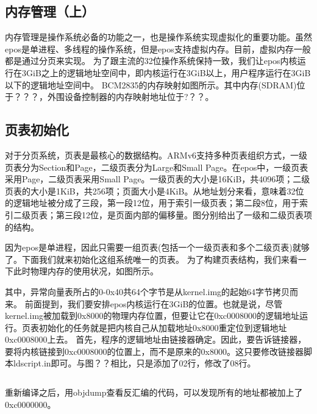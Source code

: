 \documentclass[main.tex]{subfiles}
\begin{document}
\ifxetex\else
\begin{CJK*}{UTF8}{song}
\fi

\chapter{内存管理（上）}
内存管理是操作系统必备的功能之一，也是操作系统实现虚拟化的重要功能。虽然epos是单进程、多线程的操作系统，但是epos支持虚拟内存。目前，虚拟内存一般都是通过分页来实现。
为了跟主流的32位操作系统保持一致，我们让epos内核运行在3GiB之上的逻辑地址空间中，即内核运行在3GiB以上，用户程序运行在3GiB以下的逻辑地址空间中。
BCM2835的内存映射如图所示。其中内存(SDRAM)位于？？？，外围设备控制器的内存映射地址位于?？？。

\section{页表初始化}
对于分页系统，页表是最核心的数据结构。ARMv6支持多种页表组织方式，一级页表分为Section和Page，二级页表分为Large和Small Page。在epos中，一级页表采用Page，二级页表采用Small Page。一级页表的大小是16KiB，共4096项；二级页表的大小是1KiB，共256项；页面大小是4KiB。从地址划分来看，意味着32位的逻辑地址被分成了三段，第一段12位，用于索引一级页表；第二段8位，用于索引二级页表；第三段12位，是页面内部的偏移量。图分别给出了一级和二级页表项的结构。

因为epos是单进程，因此只需要一组页表(包括一个一级页表和多个二级页表)就够了。下面我们就来初始化这组系统唯一的页表。
为了构建页表结构，我们来看一下此时物理内存的使用状况，如图所示。


其中，异常向量表所占的0-0x40共64个字节是从kernel.img的起始64字节拷贝而来。
前面提到，我们要安排epos内核运行在3GiB的位置。也就是说，尽管kernel.img被加载到0x8000的物理内存位置，但要让它在0xc0008000的逻辑地址运行。页表初始化的任务就是把内核自己从加载地址0x8000重定位到逻辑地址0xc0008000上去。
首先，程序的逻辑地址由链接器确定。因此，要告诉链接器，要将内核链接到0xc0008000的位置上，而不是原来的0x8000。这只要修改链接器脚本ldscript.in即可。与图？？相比，只是添加了02行，修改了08行。
\inputminted[linenos,numbersep=5pt,frame=lines,framesep=2mm]{c}{src/chapter04/kernel/kernel.ld.in}

重新编译之后，用objdump查看反汇编的代码，可以发现所有的地址都被加上了0xc0000000。



\end{CJK*}
\end{document}
